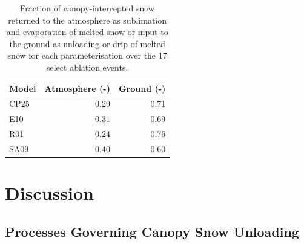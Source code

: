 \documentclass[
  letterpaper,
]{tex/uofsthesis-cs}
\begin{document}
\begin{longtable}[]{@{}lrr@{}}

\caption{\label{tbl-frac-atm-ground}Fraction of canopy-intercepted snow
returned to the atmosphere as sublimation and evaporation of melted snow
or input to the ground as unloading or drip of melted snow for each
parameterisation over the 17 select ablation events.}

\tabularnewline

\toprule\noalign{}
Model & Atmosphere (-) & Ground (-) \\
\midrule\noalign{}
\endhead
\bottomrule\noalign{}
\endlastfoot
CP25 & 0.29 & 0.71 \\
E10 & 0.31 & 0.69 \\
R01 & 0.24 & 0.76 \\
SA09 & 0.40 & 0.60 \\

\end{longtable}

\section{Discussion}\label{discussion-2}

\subsection{Processes Governing Canopy Snow
Unloading}\label{processes-governing-canopy-snow-unloading}
\end{document}
